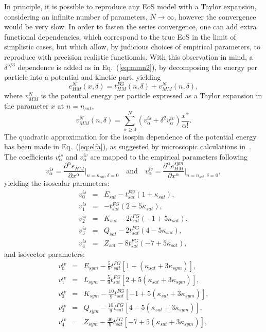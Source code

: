 {In principle, it is possible to reproduce any EoS model with a Taylor
  expansion, considering an infinite number of parameters,
  $N\rightarrow\infty$, however the convergence would be very slow. In order to 
  fasten the series convergence, one can add extra functional dependencies, 
  which correspond to the true EoS in the limit of simplistic cases, but which 
  allow, by judicious choices of empirical parameters, to reproduce with 
  precision realistic functionals.}
{With this observation in mind}, a $\delta^{5/3}$ dependence is added as
in Eq.~(\ref{eq:mmn2}), by decomposing the energy per particle into a potential 
and kinetic part, yielding
%
\begin{equation}
  e^N_{HM}(x,\delta) = t_{HM}^{FG}(n,\delta) +
  v_{MM}^N(n,\delta),\label{eq:meta}
\end{equation}
%
where $v_{MM}^N$ is the potential energy per particle expressed as a Taylor expansion
in the parameter $x$ at $n = n_{sat}$,
%
\begin{equation}
  v_{MM}^N(n,\delta) = \sum_{\alpha \geq 0}^N(v_\alpha^{is} +
  \delta^2v_\alpha^{iv})\frac{x^\alpha}{\alpha!}\label{eq:elfa}.
\end{equation}
%
The quadratic approximation for the isospin dependence of the potential energy 
has been made in Eq.~(\ref{eq:elfa}), as suggested by microscopic calculations 
in~\cite{Vidana2009}. The coefficients $v_\alpha^{is}$ and $v_\alpha^{iv}$ are
mapped to the empirical parameters following
%
\begin{equation}
  v_\alpha^{is} = \frac{\partial^\alpha e_{HM}}{\partial
  x^\alpha}\bigg|_{n=n_{sat},\delta=0} \quad \text{and} \quad v_\alpha^{iv} = \frac{\partial^\alpha e_{HM}^{sym}}{\partial
x^\alpha}\bigg|_{n=n_{sat},\delta=0},\label{eq:def_pars}
\end{equation}
%
yielding the isoscalar parameters:
%
\begin{eqnarray}
  v_0^{is} &=& E_{sat} - t_{sat}^{FG}(1+\kappa_{sat}),\\
  v_1^{is} &=& -t_{sat}^{FG}(2+5\kappa_{sat}),\\
  v_2^{is} &=& K_{sat} - 2t_{sat}^{FG}(-1+5\kappa_{sat}),\\
  v_3^{is} &=& Q_{sat} - 2t_{sat}^{FG}(4-5\kappa_{sat}),\\
  v_4^{is} &=& Z_{sat} - 8t_{sat}^{FG}(-7+5\kappa_{sat}),
\end{eqnarray}
%
and isovector parameters:
%
\begin{eqnarray}
  v_0^{iv} &=& E_{sym} - \frac{5}{9}t_{sat}^{FG}[1+(\kappa_{sat}+3\kappa_{sym})],\\
  v_1^{iv} &=& L_{sym} - \frac{5}{9}t_{sat}^{FG}[2+5(\kappa_{sat}+3\kappa_{sym})],\\
  v_2^{iv} &=& K_{sym} - \frac{10}{9}t_{sat}^{FG}[-1+5(\kappa_{sat}
  +3\kappa_{sym})],\\
  v_3^{iv} &=& Q_{sym} - \frac{10}{9}t_{sat}^{FG}[4-5(\kappa_{sat}+3\kappa_{sym})],\\
  v_4^{iv} &=& Z_{sym} -
  \frac{40}{9}t_{sat}^{FG}[-7+5(\kappa_{sat}+3\kappa_{sym})],
\end{eqnarray}
%

